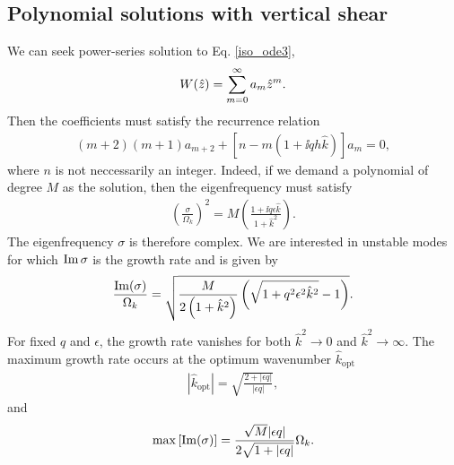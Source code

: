 \subsection{Polynomial solutions with vertical shear}
We can seek power-series solution to Eq. \ref{iso_ode3},
\begin{align}
  W(\hat{z}) = \sum_{m=0}^\infty a_m\hat{z}^m. 
\end{align}
Then the coefficients must satisfy the recurrence relation
\begin{align}
  (m+2)(m+1)a_{m+2} +
  \left[n - m\left(1+\ii q h \hat{k}\right)\right] a_m = 0, 
\end{align}
where $n$ is not neccessarily an integer. Indeed, if we demand
a polynomial of degree $M$ as the solution, then the eigenfrequency
must satisfy
\begin{align}
\left(\frac{\sigma}{\Omega_k}\right)^2 = M\left(\frac{1+\ii q \epsilon
    \hat{k}}{1+\hat{k}^2}\right).
\end{align}
The eigenfrequency $\sigma$ is therefore complex. We are interested in
unstable modes for which $\operatorname{Im}{\sigma}$ is the growth rate and is
given by 
\begin{align}\label{simple_growth}
   \frac{\operatorname{Im}(\sigma)}{\Omega_k} =\sqrt{
   \frac{M}{2\left(1+\hat{k}^2\right)}\left(\sqrt{1+q^2\epsilon^2\hat{k}^2} - 
    1\right)}. 
\end{align}
For fixed $q$ and $\epsilon$, the growth rate vanishes for both
$\hat{k}^2\to0$ and $\hat{k}^2\to\infty$. The maximum growth rate
occurs at the optimum wavenumber $\hat{k}_\mathrm{opt}$
\begin{align}
  |\hat{k}_\mathrm{opt}| = \sqrt{\frac{2+|\epsilon q|}{|\epsilon q|}},
\end{align}
and
\begin{align}
\mathrm{max}\left[\operatorname{Im}(\sigma)\right] =\frac{\sqrt{M}|\epsilon
  q|}{2\sqrt{1+|\epsilon q|}}\Omega_k. 
\end{align}



